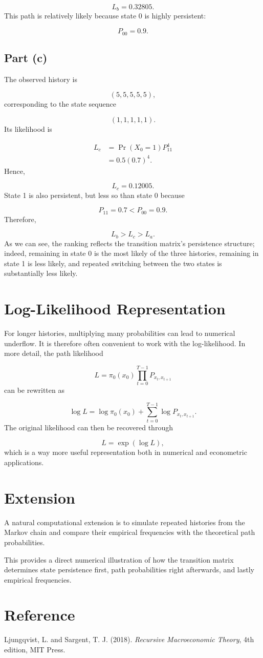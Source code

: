 \documentclass[11pt]{article}
\begin{document}
\[
\boxed{
L_b = 0.32805
}.
\]
This path is relatively likely because state 0 is highly persistent:

\[
P_{00}=0.9.
\]

\subsection*{Part (c)}

The observed history is

\[
(5,5,5,5,5),
\]
corresponding to the state sequence

\[
(1,1,1,1,1).
\]
Its likelihood is

\[
\begin{aligned}
L_c
&=
\Pr(X_0=1)
P_{11}^4 \\
&=
0.5(0.7)^4.
\end{aligned}
\]
Hence,

\[
\boxed{
L_c = 0.12005
}.
\]
State 1 is also persistent, but less so than state 0 because

\[
P_{11}=0.7 < P_{00}=0.9.
\]
Therefore,

\[
\boxed{
L_b > L_c > L_a
}.
\]
As we can see, the ranking reflects the transition matrix's persistence structure; indeed, remaining in state 0 is the most likely of the three histories, remaining in state 1 is less likely, and repeated switching between the two states is substantially less likely.

\section*{Log-Likelihood Representation}

For longer histories, multiplying many probabilities can lead to numerical underflow. It is therefore often convenient to work with the log-likelihood.
In more detail, the path likelihood

\[
L
=
\pi_0(x_0)
\prod_{t=0}^{T-1}
P_{x_t,x_{t+1}}
\]
can be rewritten as

\[
\log L
=
\log \pi_0(x_0)
+
\sum_{t=0}^{T-1}
\log P_{x_t,x_{t+1}}.
\]
The original likelihood can then be recovered through

\[
L = \exp(\log L),
\]
which is a way more useful representation both in numerical and econometric applications.


\section*{Extension}

A natural computational extension is to simulate repeated histories from the Markov chain and compare their empirical frequencies with the theoretical path probabilities.

This provides a direct numerical illustration of how the transition matrix determines state persistence first, path probabilities right afterwards, and lastly empirical frequencies.

\section*{Reference}

Ljungqvist, L. and Sargent, T. J. (2018).
\textit{Recursive Macroeconomic Theory},
4th edition, MIT Press.
\end{document}
